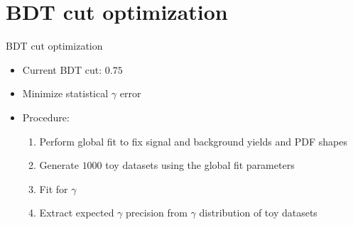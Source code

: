 \documentclass{beamer}
\begin{document}
\section{BDT cut optimization}
\begin{frame}{BDT cut optimization}
  \begin{itemize}
    \setlength\itemsep{1.5em}
    \item{Current BDT cut: $0.75$}
    \item{Minimize statistical $\gamma$ error}
    \item{Procedure:}
    \begin{enumerate}
    \setlength\itemsep{0.5em}
      \item{Perform global fit to fix signal and background yields and PDF shapes}
      \item{Generate $1000$ toy datasets using the global fit parameters}
      \item{Fit for $\gamma$}
      \item{Extract expected $\gamma$ precision from $\gamma$ distribution of toy datasets}
    \end{enumerate}
  \end{itemize}
\end{frame}
\end{document}
